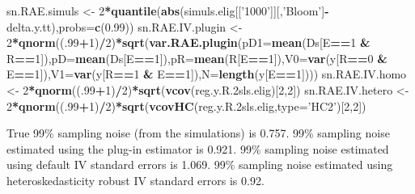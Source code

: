 \documentclass[]{book}
\newenvironment{Shaded}{\begin{snugshade}}{\end{snugshade}}
\newcommand{\KeywordTok}[1]{\textcolor[rgb]{0.13,0.29,0.53}{\textbf{#1}}}
\newcommand{\DataTypeTok}[1]{\textcolor[rgb]{0.13,0.29,0.53}{#1}}
\newcommand{\DecValTok}[1]{\textcolor[rgb]{0.00,0.00,0.81}{#1}}
\newcommand{\FloatTok}[1]{\textcolor[rgb]{0.00,0.00,0.81}{#1}}
\newcommand{\StringTok}[1]{\textcolor[rgb]{0.31,0.60,0.02}{#1}}
\newcommand{\OperatorTok}[1]{\textcolor[rgb]{0.81,0.36,0.00}{\textbf{#1}}}
\newcommand{\NormalTok}[1]{#1}
\theoremstyle{definition}
\theoremstyle{definition}
\theoremstyle{definition}
\theoremstyle{remark}
\begin{document}
\begin{Shaded}
\begin{Highlighting}[]
\NormalTok{sn.RAE.simuls <-}\StringTok{ }\DecValTok{2}\OperatorTok{*}\KeywordTok{quantile}\NormalTok{(}\KeywordTok{abs}\NormalTok{(simuls.elig[[}\StringTok{'1000'}\NormalTok{]][,}\StringTok{'Bloom'}\NormalTok{]}\OperatorTok{-}\NormalTok{delta.y.tt),}\DataTypeTok{probs=}\KeywordTok{c}\NormalTok{(}\FloatTok{0.99}\NormalTok{))}
\NormalTok{sn.RAE.IV.plugin <-}\StringTok{ }\DecValTok{2}\OperatorTok{*}\KeywordTok{qnorm}\NormalTok{((.}\DecValTok{99}\OperatorTok{+}\DecValTok{1}\NormalTok{)}\OperatorTok{/}\DecValTok{2}\NormalTok{)}\OperatorTok{*}\KeywordTok{sqrt}\NormalTok{(}\KeywordTok{var.RAE.plugin}\NormalTok{(}\DataTypeTok{pD1=}\KeywordTok{mean}\NormalTok{(Ds[E}\OperatorTok{==}\DecValTok{1} \OperatorTok{&}\StringTok{ }\NormalTok{R}\OperatorTok{==}\DecValTok{1}\NormalTok{]),}\DataTypeTok{pD=}\KeywordTok{mean}\NormalTok{(Ds[E}\OperatorTok{==}\DecValTok{1}\NormalTok{]),}\DataTypeTok{pR=}\KeywordTok{mean}\NormalTok{(R[E}\OperatorTok{==}\DecValTok{1}\NormalTok{]),}\DataTypeTok{V0=}\KeywordTok{var}\NormalTok{(y[R}\OperatorTok{==}\DecValTok{0} \OperatorTok{&}\StringTok{ }\NormalTok{E}\OperatorTok{==}\DecValTok{1}\NormalTok{]),}\DataTypeTok{V1=}\KeywordTok{var}\NormalTok{(y[R}\OperatorTok{==}\DecValTok{1} \OperatorTok{&}\StringTok{ }\NormalTok{E}\OperatorTok{==}\DecValTok{1}\NormalTok{]),}\DataTypeTok{N=}\KeywordTok{length}\NormalTok{(y[E}\OperatorTok{==}\DecValTok{1}\NormalTok{])))}
\NormalTok{sn.RAE.IV.homo <-}\StringTok{ }\DecValTok{2}\OperatorTok{*}\KeywordTok{qnorm}\NormalTok{((.}\DecValTok{99}\OperatorTok{+}\DecValTok{1}\NormalTok{)}\OperatorTok{/}\DecValTok{2}\NormalTok{)}\OperatorTok{*}\KeywordTok{sqrt}\NormalTok{(}\KeywordTok{vcov}\NormalTok{(reg.y.R.2sls.elig)[}\DecValTok{2}\NormalTok{,}\DecValTok{2}\NormalTok{])}
\NormalTok{sn.RAE.IV.hetero <-}\StringTok{ }\DecValTok{2}\OperatorTok{*}\KeywordTok{qnorm}\NormalTok{((.}\DecValTok{99}\OperatorTok{+}\DecValTok{1}\NormalTok{)}\OperatorTok{/}\DecValTok{2}\NormalTok{)}\OperatorTok{*}\KeywordTok{sqrt}\NormalTok{(}\KeywordTok{vcovHC}\NormalTok{(reg.y.R.2sls.elig,}\DataTypeTok{type=}\StringTok{'HC2'}\NormalTok{)[}\DecValTok{2}\NormalTok{,}\DecValTok{2}\NormalTok{])}
\end{Highlighting}
\end{Shaded}

True 99\% sampling noise (from the simulations) is 0.757. 99\% sampling
noise estimated using the plug-in estimator is 0.921. 99\% sampling
noise estimated using default IV standard errors is 1.069. 99\% sampling
noise estimated using heteroskedasticity robust IV standard errors is
0.92.
\end{document}

